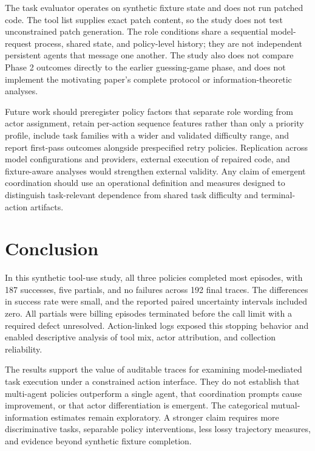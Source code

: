 \documentclass[pdflatex,sn-basic,Numbered]{sn-jnl}
\begin{document}
The task evaluator operates on synthetic fixture state and does not run patched code. The tool list supplies exact patch content, so the study does not test unconstrained patch generation. The role conditions share a sequential model-request process, shared state, and policy-level history; they are not independent persistent agents that message one another. The study also does not compare Phase 2 outcomes directly to the earlier guessing-game phase, and does not implement the motivating paper's complete protocol or information-theoretic analyses.

Future work should preregister policy factors that separate role wording from actor assignment, retain per-action sequence features rather than only a priority profile, include task families with a wider and validated difficulty range, and report first-pass outcomes alongside prespecified retry policies. Replication across model configurations and providers, external execution of repaired code, and fixture-aware analyses would strengthen external validity. Any claim of emergent coordination should use an operational definition and measures designed to distinguish task-relevant dependence from shared task difficulty and terminal-action artifacts.

\section{Conclusion}

In this synthetic tool-use study, all three policies completed most episodes, with 187 successes, five partials, and no failures across 192 final traces. The differences in success rate were small, and the reported paired uncertainty intervals included zero. All partials were billing episodes terminated before the call limit with a required defect unresolved. Action-linked logs exposed this stopping behavior and enabled descriptive analysis of tool mix, actor attribution, and collection reliability.

The results support the value of auditable traces for examining model-mediated task execution under a constrained action interface. They do not establish that multi-agent policies outperform a single agent, that coordination prompts cause improvement, or that actor differentiation is emergent. The categorical mutual-information estimates remain exploratory. A stronger claim requires more discriminative tasks, separable policy interventions, less lossy trajectory measures, and evidence beyond synthetic fixture completion.
\end{document}
